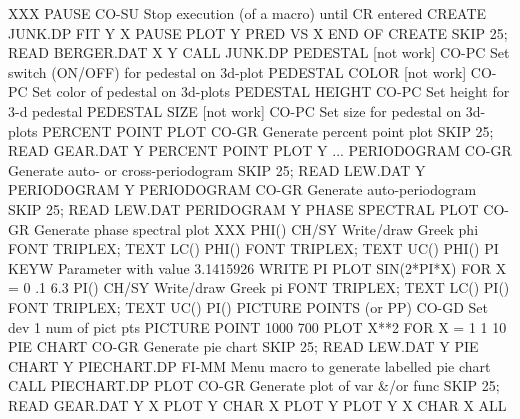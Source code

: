 XXX
PAUSE                       CO-SU Stop execution (of a macro) until CR entered
                                  CREATE JUNK.DP
                                  FIT Y X
                                  PAUSE
                                  PLOT Y PRED VS X
                                  END OF CREATE
                                  SKIP 25; READ BERGER.DAT X Y
                                  CALL JUNK.DP
PEDESTAL        [not work]  CO-PC Set switch (ON/OFF) for pedestal on 3d-plot
PEDESTAL COLOR  [not work]  CO-PC Set color of pedestal on 3d-plots
PEDESTAL HEIGHT             CO-PC Set height for 3-d pedestal
PEDESTAL SIZE   [not work]  CO-PC Set size for pedestal on 3d-plots
PERCENT POINT PLOT          CO-GR Generate percent point plot
                                  SKIP 25; READ GEAR.DAT Y
                                  PERCENT POINT PLOT Y
... PERIODOGRAM             CO-GR Generate auto- or cross-periodogram
                                  SKIP 25; READ LEW.DAT Y
                                  PERIODOGRAM Y
PERIODOGRAM                 CO-GR Generate auto-periodogram
                                  SKIP 25; READ LEW.DAT
                                  PERIDOGRAM Y
PHASE SPECTRAL PLOT         CO-GR Generate phase spectral plot
XXX
PHI()                       CH/SY Write/draw Greek phi
                                  FONT TRIPLEX; TEXT LC() PHI()
                                  FONT TRIPLEX; TEXT UC() PHI()
PI                          KEYW  Parameter with value 3.1415926
                                  WRITE PI
                                  PLOT SIN(2*PI*X) FOR X = 0 .1 6.3
PI()                        CH/SY Write/draw Greek pi
                                  FONT TRIPLEX; TEXT LC() PI()
                                  FONT TRIPLEX; TEXT UC() PI()
PICTURE POINTS (or PP)      CO-GD Set dev 1 num of pict pts
                                  PICTURE POINT 1000 700
                                  PLOT X**2 FOR X = 1 1 10
PIE CHART                   CO-GR Generate pie chart
                                  SKIP 25; READ LEW.DAT Y
                                  PIE CHART Y
PIECHART.DP                 FI-MM Menu macro to generate labelled pie chart
                                  CALL PIECHART.DP
PLOT                        CO-GR Generate plot of var &/or func
                                  SKIP 25; READ GEAR.DAT Y X
                                  PLOT Y
                                  CHAR X
                                  PLOT Y
                                  PLOT Y X
                                  CHAR X ALL
